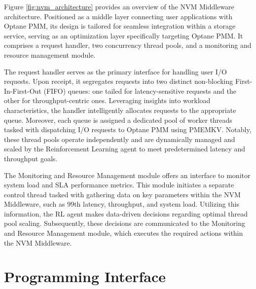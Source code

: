Figure \ref{fig:nvm_architecture} provides an overview of the NVM Middleware architecture. Positioned as a middle layer connecting user applications with Optane PMM, its design is tailored for seamless integration within a storage service, serving as an optimization layer specifically targeting Optane PMM. It comprises a request handler, two concurrency thread pools, and a monitoring and resource management module.

The request handler serves as the primary interface for handling user I/O requests. Upon receipt, it segregates requests into two distinct non-blocking First-In-First-Out (FIFO) queues: one tailed for latency-sensitive requests and the other for throughput-centric ones. Leveraging insights into workload characteristics, the handler intelligently allocates requests to the appropriate queue. Moreover, each queue is assigned a dedicated pool of worker threads tasked with dispatching I/O requests to Optane PMM using PMEMKV. Notably, these thread pools operate independently and are dynamically managed and scaled by the Reinforcement Learning agent to meet predetermined latency and throughput goals.

The Monitoring and Resource Management module offers an interface to monitor system load and SLA performance metrics. This module initiates a separate control thread tasked with gathering data on key parameters within the NVM Middleware, such as 99th latency, throughput, and system load. Utilizing this information, the RL agent makes data-driven decisions regarding optimal thread pool scaling. Subsequently, these decisions are communicated to the Monitoring and Resource Management module, which executes the required actions within the NVM Middleware.

\section{Programming Interface}

